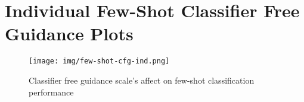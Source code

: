 
\clearpage
\section{Individual Few-Shot Classifier Free Guidance Plots} \label{app:few-shot-cfg}
\begin{figure}[h!]
    \hspace*{-2cm} 
    \centering
    \texttt{[image: img/few-shot-cfg-ind.png]}
    \vspace{-0.5cm}
    \caption{Classifier free guidance scale's affect on few-shot classification performance}
    \label{fig:few-shot-cfg-ind}
\end{figure}